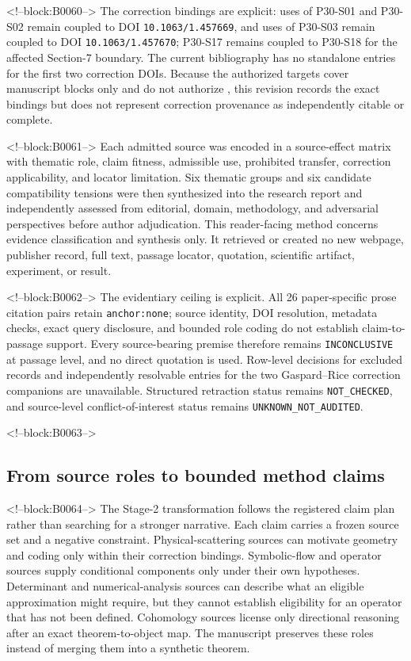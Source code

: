 \documentclass[11pt,a4paper]{article}
\begin{document}
<!--block:B0060-->
The correction bindings are explicit: uses of P30-S01 and P30-S02 remain coupled to DOI \texttt{10.1063/1.457669}, and uses of P30-S03 remain coupled to DOI \texttt{10.1063/1.457670}; P30-S17 remains coupled to P30-S18 for the affected Section-7 boundary. The current bibliography has no standalone entries for the first two correction DOIs. Because the authorized targets cover manuscript blocks only and do not authorize , this revision records the exact bindings but does not represent correction provenance as independently citable or complete.

<!--block:B0061-->
Each admitted source was encoded in a source-effect matrix with thematic role, claim fitness, admissible use, prohibited transfer, correction applicability, and locator limitation. Six thematic groups and six candidate compatibility tensions were then synthesized into the research report and independently assessed from editorial, domain, methodology, and adversarial perspectives before author adjudication. This reader-facing method concerns evidence classification and synthesis only. It retrieved or created no new webpage, publisher record, full text, passage locator, quotation, scientific artifact, experiment, or result.

<!--block:B0062-->
The evidentiary ceiling is explicit. All 26 paper-specific prose citation pairs retain \texttt{anchor:\allowbreak none}; source identity, DOI resolution, metadata checks, exact query disclosure, and bounded role coding do not establish claim-to-passage support. Every source-bearing premise therefore remains \texttt{INCONCLUSIVE} at passage level, and no direct quotation is used. Row-level decisions for excluded records and independently resolvable entries for the two Gaspard--Rice correction companions are unavailable. Structured retraction status remains \texttt{NOT\_CHECKED}, and source-level conflict-of-interest status remains \texttt{UNKNOWN\_NOT\_AUDITED}.

<!--block:B0063-->
\subsection{From source roles to bounded method claims}

<!--block:B0064-->
The Stage-2 transformation follows the registered claim plan rather than searching for a stronger narrative. Each claim carries a frozen source set and a negative constraint. Physical-scattering sources can motivate geometry and coding only within their correction bindings. Symbolic-flow and operator sources supply conditional components only under their own hypotheses. Determinant and numerical-analysis sources can describe what an eligible approximation might require, but they cannot establish eligibility for an operator that has not been defined. Cohomology sources license only directional reasoning after an exact theorem-to-object map. The manuscript preserves these roles instead of merging them into a synthetic theorem.
\end{document}
